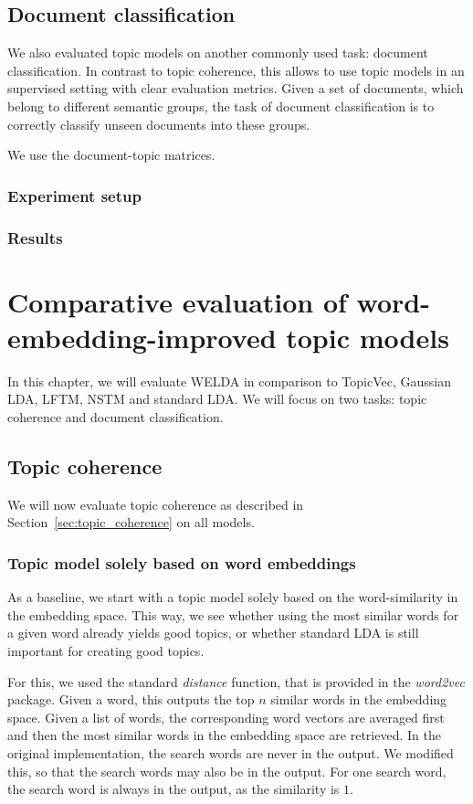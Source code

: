 \documentclass[
        a4paper,
        titlepage,
        twoside,
        parskip
        ]{scrbook}
\theoremstyle{break}
\begin{document}
\section{Document classification}
We also evaluated topic models on another commonly used task: document classification.
In contrast to topic coherence, this allows to use topic models in an supervised setting with clear evaluation metrics.
Given a set of documents, which belong to different semantic groups, the task of document classification is to correctly classify unseen documents into these groups.

We use the document-topic matrices.

\subsection{Experiment setup}
\subsection{Results}


\chapter{Comparative evaluation of word-embedding-improved topic models}
\label{sec:comparative_evaluation}

In this chapter, we will evaluate WELDA in comparison to TopicVec, Gaussian LDA, LFTM, NSTM and standard LDA.
We will focus on two tasks: topic coherence and document classification.

\section{Topic coherence}
\label{sec:evaluation_topic_coherence}

We will now evaluate topic coherence as described in Section~\ref{sec:topic_coherence} on all models.

\subsection{Topic model solely based on word embeddings}
\label{sec:raw_tm_we}
As a baseline, we start with a topic model solely based on the word-similarity in the embedding space.
This way, we see whether using the most similar words for a given word already yields good topics, or whether standard LDA is still important for creating good topics.

For this, we used the standard \emph{distance} function, that is provided in the \emph{word2vec} package.
Given a word, this outputs the top $n$ similar words in the embedding space.
Given a list of words, the corresponding word vectors are averaged first and then the most similar words in the embedding space are retrieved.
In the original implementation, the search words are never in the output.
We modified this, so that the search words may also be in the output.
For one search word, the search word is always in the output, as the similarity is $1$.
\end{document}
